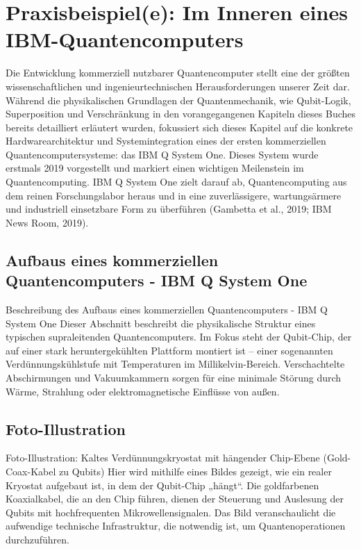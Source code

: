 \section{Praxisbeispiel(e): Im Inneren eines IBM-Quantencomputers}
Die Entwicklung kommerziell nutzbarer Quantencomputer stellt eine der größten wissenschaftlichen und ingenieurtechnischen Herausforderungen unserer Zeit dar. Während die physikalischen Grundlagen der Quantenmechanik, wie Qubit-Logik, Superposition und Verschränkung in den vorangegangenen Kapiteln dieses Buches bereits detailliert erläutert wurden, fokussiert sich dieses Kapitel auf die konkrete Hardwarearchitektur und Systemintegration eines der ersten kommerziellen Quantencomputersysteme: das IBM Q System One. Dieses System wurde erstmals 2019 vorgestellt und markiert einen wichtigen Meilenstein im Quantencomputing. IBM Q System One zielt darauf ab, Quantencomputing aus dem reinen Forschungslabor heraus und in eine zuverlässigere, wartungsärmere und industriell einsetzbare Form zu überführen (Gambetta et al., 2019; IBM News Room, 2019).


\subsection{Aufbaus eines kommerziellen Quantencomputers - IBM Q System One}
Beschreibung des Aufbaus eines kommerziellen Quantencomputers - IBM Q System One
Dieser Abschnitt beschreibt die physikalische Struktur eines typischen supraleitenden Quantencomputers. Im Fokus steht der Qubit-Chip, der auf einer stark heruntergekühlten Plattform montiert ist – einer sogenannten Verdünnungskühlstufe mit Temperaturen im Millikelvin-Bereich. Verschachtelte Abschirmungen und Vakuumkammern sorgen für eine minimale Störung durch Wärme, Strahlung oder elektromagnetische Einflüsse von außen.

\subsection{Foto-Illustration}
Foto-Illustration: Kaltes Verdünnungskryostat mit hängender Chip-Ebene (Gold-Coax-Kabel zu Qubits)
Hier wird mithilfe eines Bildes gezeigt, wie ein realer Kryostat aufgebaut ist, in dem der Qubit-Chip „hängt“. Die goldfarbenen Koaxialkabel, die an den Chip führen, dienen der Steuerung und Auslesung der Qubits mit hochfrequenten Mikrowellensignalen. Das Bild veranschaulicht die aufwendige technische Infrastruktur, die notwendig ist, um Quantenoperationen durchzuführen.


